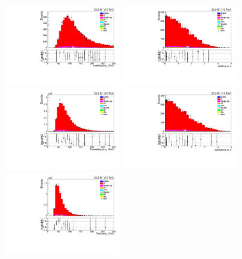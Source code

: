 \begin{figure}[ht]
\centering
\includegraphics[width=0.45\textwidth]{figs/background-estimation/plots/unblinded/ttbar_control/leadingJetPt_SingleTop_jetSel_emu.pdf}
\includegraphics[width=0.45\textwidth]{figs/background-estimation/plots/unblinded/ttbar_control/leadingJetEta_SingleTop_jetSel_emu.pdf}
\\
\includegraphics[width=0.45\textwidth]{figs/background-estimation/plots/unblinded/ttbar_control/secondJetPt_SingleTop_jetSel_emu.pdf}
\includegraphics[width=0.45\textwidth]{figs/background-estimation/plots/unblinded/ttbar_control/secondJetEta_SingleTop_jetSel_emu.pdf}
\\
\includegraphics[width=0.45\textwidth]{figs/background-estimation/plots/unblinded/ttbar_control/thirdJetPt_SingleTop_jetSel_emu.pdf}

\end{figure}
